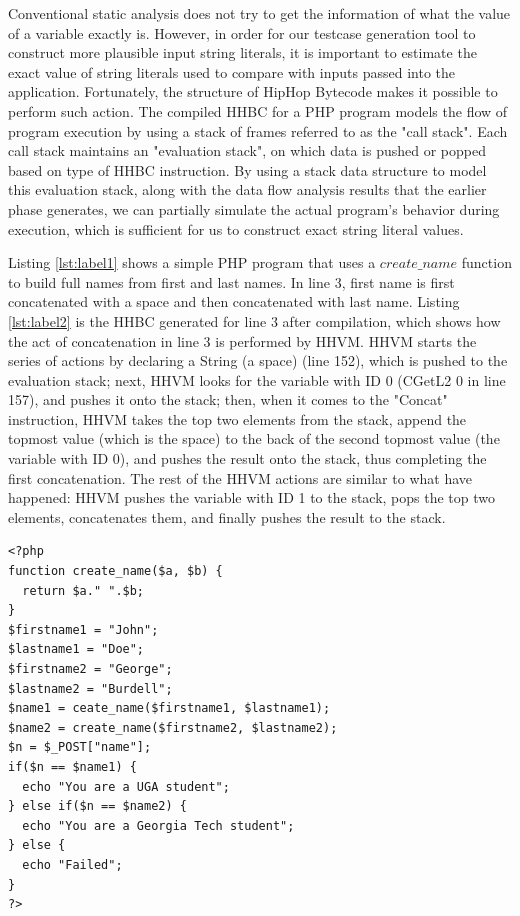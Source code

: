 Conventional static analysis does not try to get the information of what the value of a variable exactly is. However, in order for our testcase generation tool to construct more plausible input string literals, it is important to estimate the exact value of string literals used to compare with inputs passed into the application. Fortunately, the structure of HipHop Bytecode makes it possible to perform such action. The compiled HHBC for a PHP program models the flow of program execution by using a stack of frames referred to as the "call stack". Each call stack maintains an "evaluation stack", on which data is pushed or popped based on type of HHBC instruction. By using a stack data structure to model this evaluation stack, along with the data flow analysis results that the earlier phase generates, we can partially simulate the actual program's behavior during execution, which is sufficient for us to construct exact string literal values.

Listing \ref{lst:label1} shows a simple PHP program that uses a $create\_name$ function to build full names from first and last names. In line 3, first name is first concatenated with a space and then concatenated with last name. Listing \ref{lst:label2} is the HHBC generated for line 3 after compilation, which shows how the act of concatenation in line 3 is performed by HHVM. HHVM starts the series of actions by declaring a String (a space) (line 152), which is pushed to the evaluation stack; next, HHVM looks for the variable with ID 0 (CGetL2 0 in line 157), and pushes it onto the stack; then, when it comes to the "Concat" instruction, HHVM takes the top two elements from the stack, append the topmost value (which is the space) to the back of the second topmost value (the variable with ID 0), and pushes the result onto the stack, thus completing the first concatenation. The rest of the HHVM actions are similar to what have happened: HHVM pushes the variable with ID 1 to the stack, pops the top two elements, concatenates them, and finally pushes the result to the stack.

\lstset{language=PHP}
\begin{minipage}{\textwidth}
\begin{lstlisting}[caption={Sample PHP Code and Compiled HHBC Snippet},label={lst:label1},basicstyle=\small,frame=single]
<?php
function create_name($a, $b) {
  return $a." ".$b;
}
$firstname1 = "John";
$lastname1 = "Doe";
$firstname2 = "George";
$lastname2 = "Burdell";
$name1 = ceate_name($firstname1, $lastname1);
$name2 = create_name($firstname2, $lastname2);
$n = $_POST["name"];
if($n == $name1) {
  echo "You are a UGA student";
} else if($n == $name2) {
  echo "You are a Georgia Tech student";
} else {
  echo "Failed";
}
?>
\end{lstlisting}
\end{minipage}

